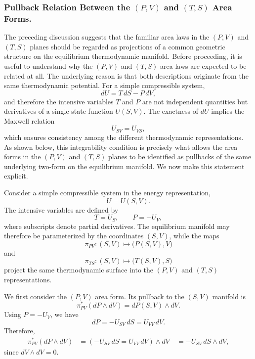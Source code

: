 



\subsubsection{Pullback Relation Between the \((P,V)\) and \((T,S)\) Area Forms.}

The preceding discussion suggests that the familiar area laws in the \((P,V)\) and \((T,S)\) planes should be regarded as projections of a common geometric structure on the equilibrium thermodynamic manifold. 
Before proceeding, it is useful to understand why the \((P,V)\) and \((T,S)\) area laws are expected to be related at all. The underlying reason is that both descriptions originate from the same thermodynamic potential. For a simple compressible system,
\[
dU
=
T\,dS
-
P\,dV,
\]
and therefore the intensive variables \(T\) and \(P\) are not independent quantities but derivatives of a single state function \(U(S,V)\). The exactness of \(dU\) implies the Maxwell relation
\[
U_{SV}
=
U_{VS},
\]
which ensures consistency among the different thermodynamic representations. As shown below, this integrability condition is precisely what allows the area forms in the \((P,V)\) and \((T,S)\) planes to be identified as pullbacks of the same underlying two-form on the equilibrium manifold.
We now make this statement explicit.

Consider a simple compressible system in the energy representation,
\begin{equation}
U=U(S,V).
\end{equation}
The intensive variables are defined by
\begin{equation}
T=U_S,
\qquad
P=-U_V,
\end{equation}
where subscripts denote partial derivatives. The equilibrium manifold may therefore be parameterized by the coordinates \((S,V)\), while the maps
\begin{equation}
\pi_{PV}:(S,V)\mapsto \big(P(S,V),V\big)
\end{equation}
and
\begin{equation}
\pi_{TS}:(S,V)\mapsto \big(T(S,V),S\big)
\end{equation}
project the same thermodynamic surface into the \((P,V)\) and \((T,S)\) representations.

We first consider the \((P,V)\) area form. Its pullback to the \((S,V)\) manifold is
\begin{equation}
\pi_{PV}^{*}(dP\wedge dV)
=
dP(S,V)\wedge dV.
\end{equation}
Using \(P=-U_V\), we have
\begin{equation}
dP
=
-U_{SV}\,dS
=
U_{VV}\,dV.
\end{equation}
Therefore,
\begin{align}
\pi_{PV}^{*}(dP\wedge dV)
&=
\left(
-U_{SV}\,dS
=
U_{VV}\,dV
\right)
\wedge dV \
&=
-U_{SV}\,dS\wedge dV,
\end{align}
since \(dV\wedge dV=0\).

